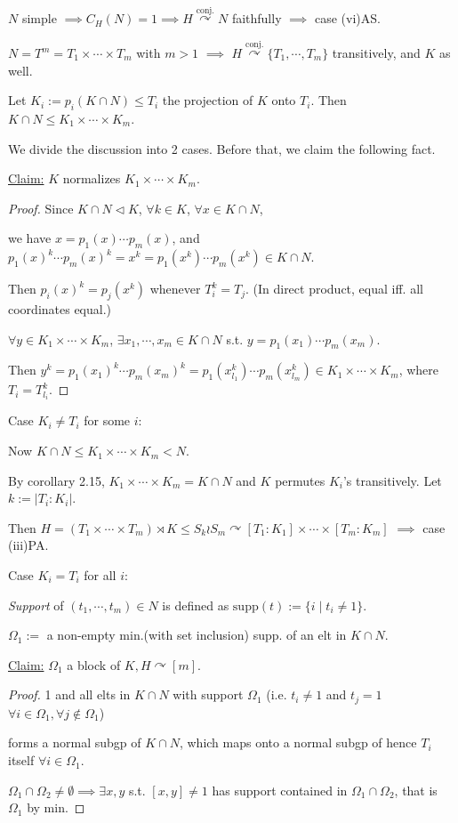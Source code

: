 \documentclass[a4paper,11pt]{article}
\begin{document}
$N$ simple $\implies C_H(N)=1\implies H\mathop{\curvearrowright}\limits^{\text{conj.}} N$ faithfully $\implies$ case (vi)AS.

$N=T^m=T_1\times\cdots\times T_m$ with $m>1$ $\implies$ $H\mathop{\curvearrowright}\limits^{\text{conj.}} \{T_1,\cdots,T_m\}$ transitively, and $K$ as well.

Let $K_i:=p_i(K\cap N)\leq T_i$ the projection of $K$ onto $T_i$. Then $K\cap N\leq K_1\times\cdots\times K_m$.

We divide the discussion into 2 cases. Before that, we claim the following fact.

\underline{Claim:} $K$ normalizes $K_1\times\cdots\times K_m$. 
{\color{gray}
\begin{proof}
    
    Since $K\cap N\triangleleft K$, $\forall k\in K$, $\forall x\in K\cap N$, 
    
    we have $x=p_1(x)\cdots p_m(x)$, and $p_1(x)^k\cdots p_m(x)^k=x^k=p_1(x^k)\cdots p_m(x^k)\in K\cap N$. 
    
    Then $p_i(x)^k=p_j(x^k)$ whenever $T_i^k=T_j$. (In direct product, equal iff. all coordinates equal.)
    
    $\forall y \in K_1\times\cdots\times K_m$, $\exists x_1,\cdots, x_m\in K\cap N$ s.t. $y=p_1(x_1)\cdots p_m(x_m)$. 
    
    Then $y^k=p_1(x_1)^k\cdots p_m(x_m)^k=p_1(x_{l_1}^k)\cdots p_m(x_{l_m}^k) \in K_1\times\cdots\times K_m$, where $T_i=T_{l_i}^k$.
\end{proof}
}

\noindent Case $K_i\neq T_i$ for some $i$: 

Now $K\cap N\leq K_1\times\cdots\times K_m < N$.

By corollary 2.15, $K_1\times\cdots\times K_m=K\cap N$ and $K$ permutes $K_i$'s transitively. Let $k:=|T_i:K_i|$. 

Then $H=(T_1\times\cdots\times  T_m)\rtimes K\leq S_k\wr S_m\curvearrowright [T_1:K_1]\times\cdots\times[T_m:K_m]$ $\implies$ case (iii)PA.

\noindent Case $K_i= T_i$ for all $i$: 

\textit{Support} of $(t_1,\cdots,t_m)\in N$ is defined as $\mathrm{supp}(t):=\{i\mid t_i\neq 1\}$.


$\Omega_1:=$ a non-empty min.(with set inclusion) supp. of an elt in $K\cap N$. 

\underline{Claim:} $\Omega_1$ a block of $K,H\curvearrowright [m]$.
{\color{gray}
\begin{proof}
    1 and all elts in $K\cap N$ with support $\Omega_1$ (i.e. $t_i\neq 1$ and $t_j=1$ $\forall i\in\Omega_1, \forall j\notin\Omega_1$) 
    
    forms a normal subgp of $K\cap N$, which maps onto a normal subgp of hence $T_i$ itself $\forall i\in\Omega_1$.
    
    $\Omega_1\cap \Omega_2\neq \emptyset\implies \exists x,y$ s.t. $[x,y]\neq 1$ has support contained in $\Omega_1\cap \Omega_2$, that is $\Omega_1$ by min.
\end{proof}
}
\end{document}
